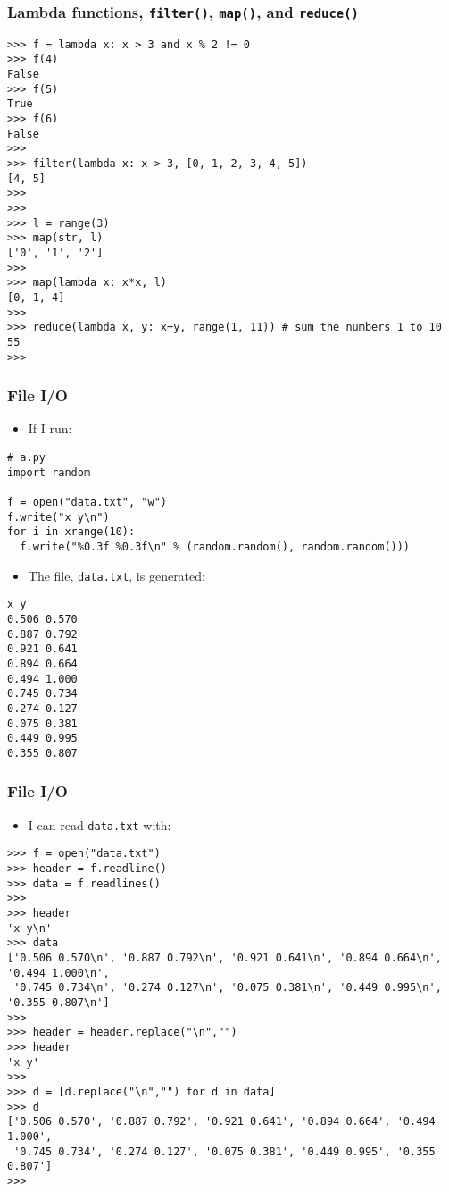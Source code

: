 \documentclass[handout]{beamer}
\numberwithin{equation}{section}
\begin{document}
\begin{frame}[fragile]
\frametitle{Lambda functions, {\tt filter()}, {\tt map()}, and {\tt reduce()}}

\begin{lstlisting}[name=ex]
>>> f = lambda x: x > 3 and x % 2 != 0
>>> f(4)
False
>>> f(5)
True
>>> f(6)
False
>>> 
>>> filter(lambda x: x > 3, [0, 1, 2, 3, 4, 5])
[4, 5]
>>>
>>>
>>> l = range(3)
>>> map(str, l)
['0', '1', '2']
>>>
>>> map(lambda x: x*x, l)
[0, 1, 4]
>>>
>>> reduce(lambda x, y: x+y, range(1, 11)) # sum the numbers 1 to 10
55
>>>
\end{lstlisting}
\end{frame}



\begin{frame}[fragile]
\frametitle{File I/O}

\begin{itemize}
\item If I run:
\end{itemize}

\begin{lstlisting}[name=ex]
# a.py
import random

f = open("data.txt", "w")
f.write("x y\n")
for i in xrange(10):
  f.write("%0.3f %0.3f\n" % (random.random(), random.random()))
\end{lstlisting}


\pause


\begin{itemize}
\item The file, {\tt data.txt}, is generated:
\end{itemize}

\begin{lstlisting}[name=ex]
x y
0.506 0.570
0.887 0.792
0.921 0.641
0.894 0.664
0.494 1.000
0.745 0.734
0.274 0.127
0.075 0.381
0.449 0.995
0.355 0.807
\end{lstlisting}
\end{frame}


\begin{frame}[fragile]
\frametitle{File I/O}

\begin{itemize}
\item I can read {\tt data.txt} with:
\end{itemize}

\begin{lstlisting}[name=ex]
>>> f = open("data.txt")
>>> header = f.readline()
>>> data = f.readlines()
>>> 
>>> header
'x y\n'
>>> data
['0.506 0.570\n', '0.887 0.792\n', '0.921 0.641\n', '0.894 0.664\n', '0.494 1.000\n', 
 '0.745 0.734\n', '0.274 0.127\n', '0.075 0.381\n', '0.449 0.995\n', '0.355 0.807\n']
>>>
>>> header = header.replace("\n","")
>>> header
'x y'
>>>
>>> d = [d.replace("\n","") for d in data]
>>> d
['0.506 0.570', '0.887 0.792', '0.921 0.641', '0.894 0.664', '0.494 1.000',
 '0.745 0.734', '0.274 0.127', '0.075 0.381', '0.449 0.995', '0.355 0.807']
>>> 
\end{lstlisting}
\end{frame}
\end{document}
